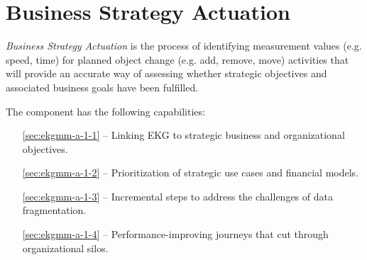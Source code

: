 \chapter{Business Strategy Actuation}\label{ch:ekgmm-a-1} %

\textit{Business Strategy Actuation} is the process of identifying measurement values (e.g. speed, time)
for planned object change (e.g. add, remove, move) activities that will provide an accurate way of
assessing whether strategic objectives and associated business goals have been fulfilled.

The  component has the following capabilities:

\begin{itemize}[leftmargin=.5in]
  \item [\ref{sec:ekgmm-a-1-1}]  -- Linking EKG to strategic business and organizational objectives.
  \item [\ref{sec:ekgmm-a-1-2}]  -- Prioritization of strategic use cases and financial models.
  \item [\ref{sec:ekgmm-a-1-3}]  -- Incremental steps to address the challenges of data fragmentation.
  \item [\ref{sec:ekgmm-a-1-4}]  -- Performance-improving journeys that cut through organizational silos.
\end{itemize}





